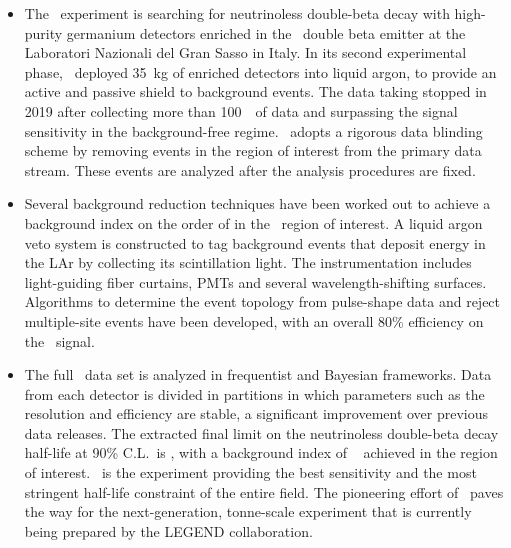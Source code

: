\chapsummary
\begin{itemize}
  \item The \gerda\ experiment is searching for neutrinoless double-beta decay with
    high-purity germanium detectors enriched in the \gesix\ double beta emitter at the
    Laboratori Nazionali del Gran Sasso in Italy. In its second experimental phase,
    \gerda\ deployed 35~kg of enriched detectors into liquid argon, to provide an active
    and passive shield to background events. The data taking stopped in 2019 after
    collecting more than 100~\kgyr\ of data and surpassing the  signal
    sensitivity in the background-free regime. \gerda\ adopts a rigorous data blinding
    scheme by removing events in the region of interest from the primary data stream.
    These events are analyzed after the analysis procedures are fixed.
  \item Several background reduction techniques have been worked out to achieve a
    background index on the order of  in the \onbb\ region of interest. A
    liquid argon veto system is constructed to tag background events that deposit energy
    in the LAr by collecting its scintillation light. The instrumentation includes
    light-guiding fiber curtains, PMTs and several wavelength-shifting surfaces.
    Algorithms to determine the event topology from pulse-shape data and reject
    multiple-site events have been developed, with an overall 80\% efficiency on the
    \onbb\ signal.
  \item The full \gerda\ data set is analyzed in frequentist and Bayesian frameworks. Data
    from each detector is divided in partitions in which parameters such as the resolution
    and efficiency are stable, a significant improvement over previous data releases. The
    extracted final limit on the neutrinoless double-beta decay half-life at 90\% C.L.~is
    \gerdafinallimit, with a background index of
    ~ achieved in the region of interest. \gerda\
    is the experiment providing the best sensitivity and the most stringent half-life
    constraint of the entire field. The pioneering effort of \gerda\ paves the way for the
    next-generation, tonne-scale experiment that is currently being prepared by the LEGEND
    collaboration.
\end{itemize}


